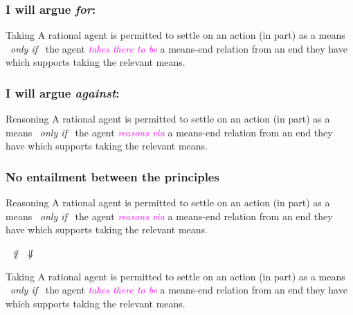\documentclass[noamssymb,
]{beamer} %
\begin{document}
\begin{frame}
  \frametitle{I will argue \emph{for}:}

  \begin{block}{Taking}
    A rational agent is permitted to settle on an action (in part) as a means
    \newline
    \mbox{ }\hfill\emph{only if}\hfill\mbox{ }
    \newline
    the agent \textcolor{fuchsia}{\emph{takes there to be}} a means-end relation from an end they have which supports taking the relevant means.
  \end{block}
\end{frame}


\begin{frame}
  \frametitle{I will argue \emph{against}:}

  \begin{block}{Reasoning}
    A rational agent is permitted to settle on an action (in part) as a means
    \newline
    \mbox{ }\hfill\emph{only if}\hfill\mbox{ }
    \newline
    the agent \textcolor{fuchsia}{\emph{reasons via}} a means-end relation from an end they have which supports taking the relevant means.
  \end{block}
\end{frame}

\begin{frame}
  \frametitle{No entailment between the principles}

  \begin{block}{Reasoning}
    A rational agent is permitted to settle on an action (in part) as a means
    \newline
    \mbox{ }\hfill\emph{only if}\hfill\mbox{ }
    \newline
    the agent \textcolor{fuchsia}{\emph{reasons via}}  a means-end relation from an end they have which supports taking the relevant means.
  \end{block}

  {\Large \mbox{ }\hfill \(\not\Uparrow\) \qquad \(\not\Downarrow\) \hfill\mbox{ }}

  \begin{block}{Taking}
    A rational agent is permitted to settle on an action (in part) as a means
    \newline
    \mbox{ }\hfill\emph{only if}\hfill\mbox{ }
    \newline
    the agent \textcolor{fuchsia}{\emph{takes there to be}} a means-end relation from an end they have which supports taking the relevant means.
  \end{block}

\end{frame}
\end{document}
